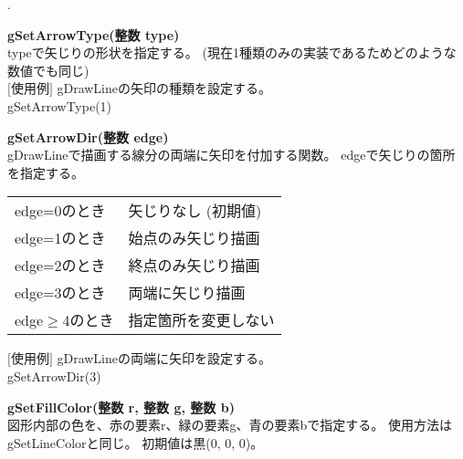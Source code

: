 \documentclass[11pt,a4j]{jarticle}
\newcounter{enum2}
\newenvironment{enumerate2}{%
   \begin{list}%
   {%
      \arabic{enum2}.\ \,%
   }%
   {%
      \usecounter{enum2}
      \setlength{\itemindent}{0zw}%
      \setlength{\leftmargin}{3zw}%
      \setlength{\rightmargin}{0zw}%
      \setlength{\labelsep}{0zw}%
      \setlength{\labelwidth}{3zw}%
      \setlength{\itemsep}{0em}%
      \setlength{\parsep}{0em}%
      \setlength{\listparindent}{0zw}%
   }
}{%
   \end{list}%
}
\begin{document}
\begin{enumerate2}
\item {\bf{gSetArrowType(整数 type)}} \\
       typeで矢じりの形状を指定する。
       (現在1種類のみの実装であるためどのような数値でも同じ) \\

	 \hspace{10pt}  $[$使用例$]$  gDrawLineの矢印の種類を設定する。 \\
         \hspace{55pt}     gSetArrowType(1) \\

\item {\bf{gSetArrowDir(整数 edge)}} \\
       gDrawLineで描画する線分の両端に矢印を付加する関数。
       edgeで矢じりの箇所を指定する。

      \begin{table}[!h]
      \begin{center}
      {\small{
      \begin{tabular}{l l}
       edge=0のとき & 矢じりなし (初期値) \\ 
       edge=1のとき & 始点のみ矢じり描画 \\
       edge=2のとき & 終点のみ矢じり描画 \\
       edge=3のとき & 両端に矢じり描画 \\
       edge$\geq$4のとき & 指定箇所を変更しない \\
      \end{tabular}
      }}
      \end{center}
      \end{table}
       \vspace{-5mm}
        \hspace{10pt}   $[$使用例$]$  gDrawLineの両端に矢印を設定する。 \\
        \hspace{55pt}    gSetArrowDir(3) \\

\item {\bf{gSetFillColor(整数 r, 整数 g, 整数 b)}} \\
       図形内部の色を、赤の要素r、緑の要素g、青の要素bで指定する。
使用方法はgSetLineColorと同じ。
       初期値は黒(0, 0, 0)。\\


\end{enumerate2}
\end{document}
